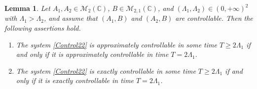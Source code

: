 \documentclass[JEP,XML,SOM,Unicode]{cedram}
\theoremstyle{plain}
\newtheorem{lemm}[theo]{Lemma}
\theoremstyle{definition}
\begin{document}
\begin{lemm}
\label{LemmTime2}
Let $A_1, A_2 \in \mathcal M_2(\mathbb C)$, $B \in \mathcal M_{2, 1}(\mathbb C)$, and $(\Lambda_1, \Lambda_2) \in (0, +\infty)^2$ with $\Lambda_1 > \Lambda_2$, and assume that $(A_1, B)$ and $(A_2, B)$ are controllable. Then the following assertions hold.
\begin{enumerate}
\item The system \eqref{Control22} is approximately controllable in some time $T \geq 2 \Lambda_1$ if and only if it is approximately controllable in time $T = 2 \Lambda_1$.
\item The system \eqref{Control22} is exactly controllable in some time $T \geq 2 \Lambda_1$ if and only if it is exactly controllable in time $T = 2 \Lambda_1$.
\end{enumerate}
\end{lemm}
\end{document}
